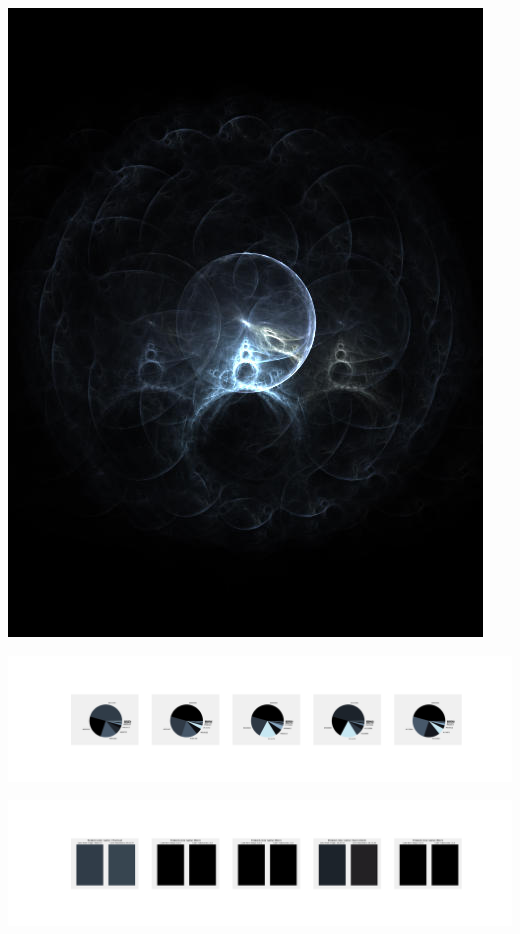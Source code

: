 \documentclass[11pt]{article}
\begin{document}
\begin{landscape}
    \begin{center}
    \includegraphics[width=\textwidth]{./nbimg/file (29).jpg}
    \end{center}

    \begin{center}
    \includegraphics[width=250mm]{./nbimg/pie-211.jpg}
    \end{center}

    \begin{center}
    \includegraphics[width=250mm]{./nbimg/peak-211.jpg}
    \end{center}
    


\end{landscape}
\end{document}
